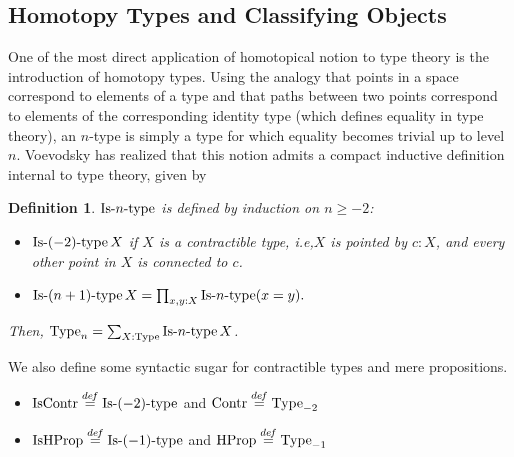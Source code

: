 \documentclass[conference]{IEEEtran}
\newtheorem{defi}[thm]{Definition}
\newcommand \defeq {\overset{de\hspace{-0.2ex}f}{=}}
\newcommand{\ie}{i.e,\xspace}
\DeclareMathOperator{\Type}{Type}
\DeclareMathOperator{\HProp}{HProp}
\DeclareMathOperator{\IsHProp}{IsHProp}
\DeclareMathOperator{\Contr}{Contr}
\DeclareMathOperator{\IsContr}{IsContr}
\def\mymathhyphen{{\hbox{-}}}
\newcommand{\IsType}[1]
{\mathop{\mathrm{Is\mymathhyphen}#1\mathrm{\mymathhyphen type}} }
\begin{document}
 \subsection{Homotopy Types and Classifying Objects}
\label{ssec:hott}

One of the most direct application of homotopical notion to type
theory is the introduction of homotopy types. 
%
Using the analogy that points in a space correspond to elements of a
type and that paths between two points correspond to 
elements of the corresponding identity type (which defines equality in type theory),  
%
an $n$-type is simply a type
for which equality becomes trivial up to level $n$. 
%
Voevodsky has realized that this notion admits a compact inductive definition
internal to type theory, given by
\begin{defi}
  $\IsType n$ is defined by induction on $n\geqslant -2$:
  \begin{itemize}
  \item $\IsType {(-2)} X$ if $X$ is a contractible type, \ie $X$
    is pointed by $c:X$, and every other point in $X$ is connected to $c$.
  \item $\IsType {(n+1)} X = \prod_{x,y:X} \IsType n (x=y).$
  \end{itemize}
  Then, $\Type_n = \sum_{X:\Type} \IsType n X$.
\end{defi}
%
We also define some syntactic sugar for contractible types and mere propositions.

\begin{itemize}
\item $\IsContr \defeq \IsType {(-2)}$ and $\Contr \defeq \Type_{-2}$
\item $\IsHProp \defeq \IsType {(-1)}$ and $\HProp \defeq \Type_{-1}$
\end{itemize}
\end{document}
